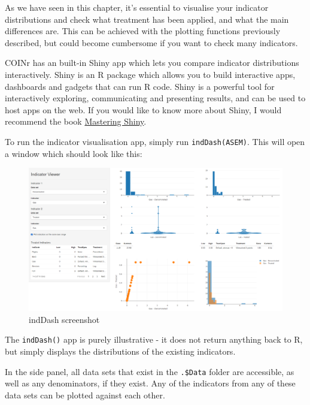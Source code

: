 \documentclass[
]{book}
\begin{document}
As we have seen in this chapter, it's essential to visualise your indicator distributions and check what treatment has been applied, and what the main differences are. This can be achieved with the plotting functions previously described, but could become cumbersome if you want to check many indicators.

COINr has an built-in Shiny app which lets you compare indicator distributions interactively. Shiny is an R package which allows you to build interactive apps, dashboards and gadgets that can run R code. Shiny is a powerful tool for interactively exploring, communicating and presenting results, and can be used to host apps on the web. If you would like to know more about Shiny, I would recommend the book \href{https://mastering-shiny.org/index.html}{Mastering Shiny}.

To run the indicator visualisation app, simply run \texttt{indDash(ASEM)}. This will open a window which should look like this:

\begin{figure}

{\centering \includegraphics[width=1\linewidth]{images/inddash_screenshot} 

}

\caption{indDash screenshot}\label{fig:unnamed-chunk-40}
\end{figure}

The \texttt{indDash()} app is purely illustrative - it does not return anything back to R, but simply displays the distributions of the existing indicators.

In the side panel, all data sets that exist in the \texttt{.\$Data} folder are accessible, as well as any denominators, if they exist. Any of the indicators from any of these data sets can be plotted against each other.
\end{document}
